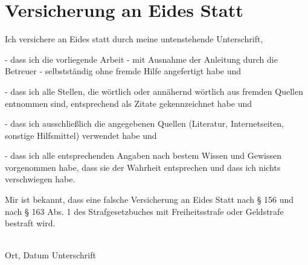 \newpage
\chapter*{Versicherung an Eides Statt}
Ich versichere an Eides statt durch meine untenstehende Unterschrift,

- dass ich die vorliegende Arbeit - mit Ausnahme der Anleitung durch die Betreuer -
selbstständig ohne fremde Hilfe angefertigt habe und

- dass ich alle Stellen, die wörtlich oder annähernd wörtlich aus fremden Quellen entnommen
sind, entsprechend als Zitate gekennzeichnet habe und

- dass ich ausschließlich die angegebenen Quellen (Literatur, Internetseiten,
sonstige Hilfsmittel) verwendet habe und

- dass ich alle entsprechenden Angaben nach bestem Wissen und Gewissen vorgenommen
habe, dass sie der Wahrheit entsprechen und dass ich nichts verschwiegen habe.

Mir ist bekannt, dass eine falsche Versicherung an Eides Statt nach § 156 und nach
§ 163 Abs. 1 des Strafgesetzbuches mit Freiheitsstrafe oder Geldstrafe bestraft wird.

\vspace{1.5cm}

\noindent\makebox[2.5in]{\hrulefill}
\hspace{1.55cm}
\noindent\makebox[2.5in]{\hrulefill}\\
Ort, Datum 
\hspace{6cm}
Unterschrift
